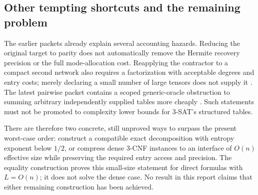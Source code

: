 \subsection{Other tempting shortcuts and the remaining problem}

The earlier packets already explain several accounting hazards. Reducing
the original target to parity does not automatically remove the Hermite
recovery precision or the full mode-allocation cost. Reapplying the
contractor to a compact second network also requires a factorization
with acceptable degrees and entry costs; merely declaring a small
number of large tensors does not supply it \cite{precision,barriers}.
The latest pairwise packet contains a scoped generic-oracle obstruction
to summing arbitrary independently supplied tables more cheaply
\cite{pairwise}. Such statements must not be promoted to complexity
lower bounds for 3-SAT's structured tables.

There are therefore two concrete, still unproved ways to surpass the
present worst-case order: construct a compatible exact decomposition
with entropy exponent below $1/2$, or compress dense 3-CNF instances to
an interface of $O(n)$ effective size while preserving the required
entry access and precision. The equality construction proves this
small-size statement for direct formulas with $L=O(n)$; it does not
solve the dense case. No result in this report claims that either
remaining construction has been achieved.
